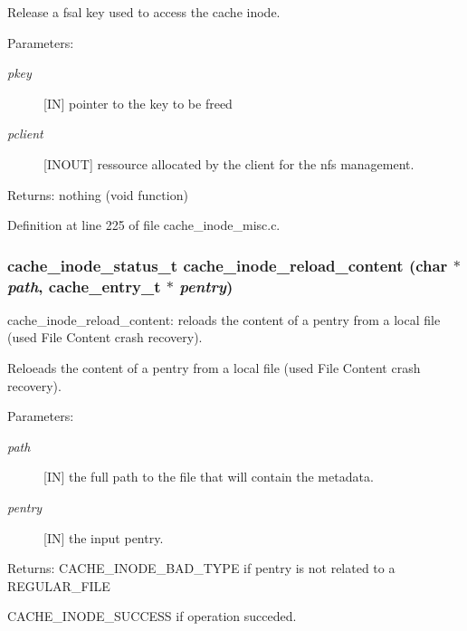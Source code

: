 Release a fsal key used to access the cache inode.

\begin{Desc}
\item[Parameters:]
\begin{description}
\item[{\em pkey}][IN] pointer to the key to be freed \item[{\em pclient}][INOUT] ressource allocated by the client for the nfs management.\end{description}
\end{Desc}
\begin{Desc}
\item[Returns:]nothing (void function) \end{Desc}


Definition at line 225 of file cache\_\-inode\_\-misc.c.
\subsubsection[{cache\_\-inode\_\-reload\_\-content}]{\setlength{\rightskip}{0pt plus 5cm}cache\_\-inode\_\-status\_\-t cache\_\-inode\_\-reload\_\-content (char $\ast$ {\em path}, \/  cache\_\-entry\_\-t $\ast$ {\em pentry})}\label{cache__inode__misc_8c_e0a8ae792a80e2143f3ae5cc1bffe95d}


cache\_\-inode\_\-reload\_\-content: reloads the content of a pentry from a local file (used File Content crash recovery).

Reloeads the content of a pentry from a local file (used File Content crash recovery).

\begin{Desc}
\item[Parameters:]
\begin{description}
\item[{\em path}][IN] the full path to the file that will contain the metadata. \item[{\em pentry}][IN] the input pentry.\end{description}
\end{Desc}
\begin{Desc}
\item[Returns:]CACHE\_\-INODE\_\-BAD\_\-TYPE if pentry is not related to a REGULAR\_\-FILE \par
 

CACHE\_\-INODE\_\-SUCCESS if operation succeded. \end{Desc}


